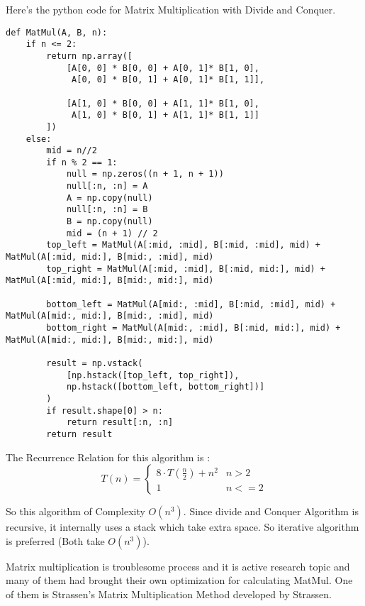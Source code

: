 \documentclass[11pt, a4paper]{article}
\begin{document}
Here's the python code for Matrix Multiplication with Divide and Conquer.
\begin{verbatim}
def MatMul(A, B, n):
    if n <= 2:
        return np.array([
            [A[0, 0] * B[0, 0] + A[0, 1]* B[1, 0],
             A[0, 0] * B[0, 1] + A[0, 1]* B[1, 1]],
              
            [A[1, 0] * B[0, 0] + A[1, 1]* B[1, 0],
             A[1, 0] * B[0, 1] + A[1, 1]* B[1, 1]]
        ])
    else:
        mid = n//2
        if n % 2 == 1:
            null = np.zeros((n + 1, n + 1))
            null[:n, :n] = A
            A = np.copy(null)
            null[:n, :n] = B
            B = np.copy(null)
            mid = (n + 1) // 2
        top_left = MatMul(A[:mid, :mid], B[:mid, :mid], mid) + MatMul(A[:mid, mid:], B[mid:, :mid], mid)
        top_right = MatMul(A[:mid, :mid], B[:mid, mid:], mid) + MatMul(A[:mid, mid:], B[mid:, mid:], mid)
              
        bottom_left = MatMul(A[mid:, :mid], B[:mid, :mid], mid) + MatMul(A[mid:, mid:], B[mid:, :mid], mid)
        bottom_right = MatMul(A[mid:, :mid], B[:mid, mid:], mid) + MatMul(A[mid:, mid:], B[mid:, mid:], mid)

        result = np.vstack(
            [np.hstack([top_left, top_right]),
            np.hstack([bottom_left, bottom_right])]
        )
        if result.shape[0] > n:
            return result[:n, :n]
        return result
\end{verbatim}

The Recurrence Relation for this algorithm is :
\begin{equation}
    T(n) = 
    \begin{cases}
        8 \cdot T\left(\frac{n}{2}\right) + n^2 & n > 2\\
        1 & n <= 2
    \end{cases}
\end{equation}

So this algorithm of Complexity $O(n^3)$. Since divide and Conquer Algorithm is recursive, it internally uses a stack which take extra space. So iterative algorithm is preferred (Both take $O(n^3)$).

Matrix multiplication is troublesome process and it is active research topic and many of them had brought their own optimization for calculating MatMul. One of them is Strassen's Matrix Multiplication Method developed by Strassen.
\end{document}
